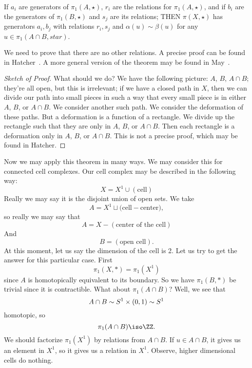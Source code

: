 \begin{thm}
If $a_i$ are generators of $\pi_1(A,\star)$, $r_i$ are the
relations for $\pi_1(A,\star)$, and if $b_i$ are the generators
of $\pi_1(B,\star)$ and $s_j$ are its relations; THEN
$\pi(X,\star)$ has generators $a_i,b_j$ with relations $r_i,s_j$
and $\alpha(u)\sim\beta(u)$ for any $u\in\pi_1(A\cap B,star)$.
\end{thm}

We need to prove that there are no other relations. A precise
proof can be found in
Hatcher~\cite[\S1.2]{hatcher2006algebraic}. A more general
version of the theorem may be found in May~\cite[\S2.7]{may}.

\begin{proof}[Sketch of Proof]
What should we do? We have the following picture: $A$, $B$,
$A\cap B$; they're all open, but this is irrelevant; if we have a
closed path in $X$, then we can divide our path into small pieces
in such a way that every small piece is in either $A$, $B$, or
$A\cap B$. We consider another such path. We consider the
deformation of these paths. But a deformation is a function of a
rectangle. We divide up the rectangle such that they are only in
$A$, $B$, or $A\cap B$. Then each rectangle is a deformation only
in $A$, $B$, or $A\cap B$. This is not a precise proof, which may
be found in Hatcher.
\end{proof}

Now we may apply this theorem in many ways. We may consider this
for connected cell complexes. Our cell complex may be described
in the following way:
\begin{equation}
X=X^1\cup(\mbox{cell})
\end{equation}
Really we may say it is the disjoint union of open sets. We take
\begin{equation}
A=X^1\sqcup\bigl(\mbox{cell}-\mbox{center}\bigr),
\end{equation}
so really we may say that
\begin{equation}
A=X-(\mbox{center of the cell})
\end{equation}
And 
\begin{equation}
B=(\mbox{open cell}).
\end{equation}
At this moment, let us say the dimension of the cell is 2. Let us
try to get the answer for this particular case. First
\begin{equation}
\pi_1(X,*)=\pi_1(X^1)
\end{equation}
since $A$ is homotopically equivalent to its boundary. So we have
$\pi_1(B,*)$ be trivial since it is contractible. What about
$\pi_1(A\cap B)$? Well, we see that 
\begin{equation}
A\cap B\sim S^1\times(0,1)\sim S^1
\end{equation}
homotopic, so
\begin{equation}
\pi_1(A\cap B)\iso\ZZ.
\end{equation}
We should factorize $\pi_1(X^1)$ by relations from $A\cap B$. If
$u\in A\cap B$, it gives us an element in $X^1$, so it gives us a
relation in $X^1$. Observe, higher dimensional cells do nothing.
